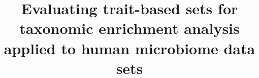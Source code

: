 \documentclass{bmcart}
\begin{document}
\begin{frontmatter}

\begin{fmbox}


\title{Evaluating trait-based sets for taxonomic enrichment analysis applied to human microbiome data sets}


\author[
  addressref={aff1,aff2},                   
  email={quang.p.nguyen.gr@dartmouth.edu}   %
]{ }
\author[
  addressref={aff1,aff2},
  email={anne.g.hoen@dartmouth.edu}
]{ }
\author[
  addressref={aff1},
  corref={aff1},
  email={hildreth.r.frost@dartmouth.edu}
]{ }


\address[id=aff1]{%
  ,             %
  ,          %
  ,                              %
}
\address[id=aff2]{%
  ,
  ,
  ,
}


\end{fmbox}
\end{frontmatter}
\end{document}

